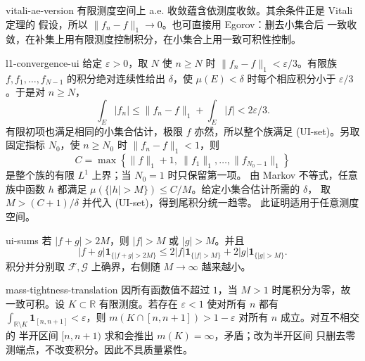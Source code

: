 \begin{solution}{vitali-ae-version}
有限测度空间上 a.e. 收敛蕴含依测度收敛。其余条件正是 Vitali 定理的
假设，所以 \(\|f_n-f\|_1\to0\)。也可直接用 Egorov：删去小集合后
一致收敛，在补集上用有限测度控制积分，在小集合上用一致可积性控制。
\end{solution}

\begin{solution}{l1-convergence-ui}
给定 \(\varepsilon>0\)，取 \(N\) 使 \(n\ge N\) 时
\(\|f_n-f\|_1<\varepsilon/3\)。有限族
\(f,f_1,\ldots,f_{N-1}\) 的积分绝对连续性给出 \(\delta\)，使
\(\mu(E)<\delta\) 时每个相应积分小于 \(\varepsilon/3\)。于是对
\(n\ge N\)，
\[
 \int_E|f_n|
 \le\|f_n-f\|_1+\int_E|f|<2\varepsilon/3.
\]
有限初项也满足相同的小集合估计，极限 \(f\) 亦然，所以整个族满足
\textup{(UI-set)}。另取固定指标 \(N_0\)，使 \(n\ge N_0\) 时
\(\|f_n-f\|_1<1\)，则
\[
 C=\max\left\{\|f\|_1+1,\ \|f_1\|_1,\ldots,\|f_{N_0-1}\|_1\right\}
\]
是整个族的有限 \(L^1\) 上界；当 \(N_0=1\) 时只保留第一项。
由 Markov 不等式，任意族中函数 \(h\) 都满足
\(\mu(\{|h|>M\})\le C/M\)。给定小集合估计所需的 \(\delta\)，
取 \(M>(C+1)/\delta\) 并代入 \textup{(UI-set)}，得到尾积分统一趋零。
此证明适用于任意测度空间。
\end{solution}

\begin{solution}{ui-sums}
若 \(|f+g|>2M\)，则 \(|f|>M\) 或 \(|g|>M\)。并且
\[
 |f+g|\mathbf1_{\{|f+g|>2M\}}
 \le2|f|\mathbf1_{\{|f|>M\}}
   +2|g|\mathbf1_{\{|g|>M\}}.
\]
积分并分别取 \(\mathcal F,\mathcal G\) 上确界，右侧随
\(M\to\infty\) 越来越小。
\end{solution}

\begin{solution}{mass-tightness-translation}
因所有函数值不超过 \(1\)，当 \(M>1\) 时尾积分为零，故一致可积。设
\(K\subset\mathbb R\) 有限测度。若存在 \(\varepsilon<1\) 使对所有
\(n\) 都有
\(\int_{\mathbb R\setminus K}\mathbf1_{[n,n+1]}<\varepsilon\)，则
\(m(K\cap[n,n+1])>1-\varepsilon\) 对所有 \(n\) 成立。对互不相交的
半开区间 \([n,n+1)\) 求和会推出 \(m(K)=\infty\)，矛盾；改为半开区间
只删去零测端点，不改变积分。因此不具质量紧性。
\end{solution}

